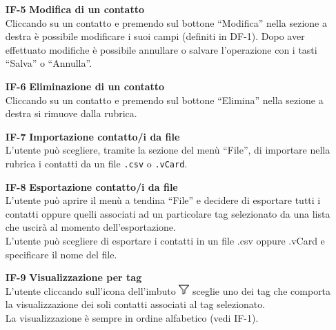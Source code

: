 \begin{tcolorbox}[breakable, colback=white,colframe=black!80!white,title=\textbf{Funzionalità individuali IF}]
\begin{itemize}[itemsep=2pt, topsep=0pt]
		\item[\textbf{IF-5}] \textbf{Modifica di un contatto}
		\\Cliccando su un contatto e premendo sul bottone “Modifica” nella sezione a destra è possibile modificare i suoi campi (definiti in DF-1). Dopo aver effettuato modifiche è possibile annullare o salvare l’operazione con i tasti “Salva” o “Annulla”.
		
		\item[\textbf{IF-6}] \textbf{Eliminazione di un contatto}
		\\Cliccando su un contatto e premendo sul bottone “Elimina” nella sezione a destra si rimuove dalla rubrica.
		
		\item[\textbf{IF-7}] \textbf{Importazione contatto/i da file}
		\\L’utente può scegliere, tramite la sezione del menù “File”, di importare nella rubrica i contatti da un file \texttt{.csv} o \texttt{.vCard}.
	
		\item[\textbf{IF-8}] \textbf{Esportazione contatto/i da file}
		\\L’utente può aprire il menù a tendina “File” e decidere di esportare 
		tutti i contatti oppure quelli associati ad un particolare tag selezionato 
		da una lista che uscirà al momento dell’esportazione.
		\\L’utente può scegliere di esportare i contatti in un file .csv oppure 
		.vCard e specificare il nome del file. 
		
		\item[\textbf{IF-9}] \textbf{Visualizzazione per tag}
		\\L’utente cliccando sull’icona dell’imbuto \includegraphics[height=0.4cm]{images/imbuto_icona.jpeg} sceglie uno dei tag che comporta la visualizzazione dei soli contatti associati al tag selezionato.
		\\La visualizzazione è sempre in ordine alfabetico (vedi IF-1).
		
	\end{itemize}
\end{tcolorbox}

